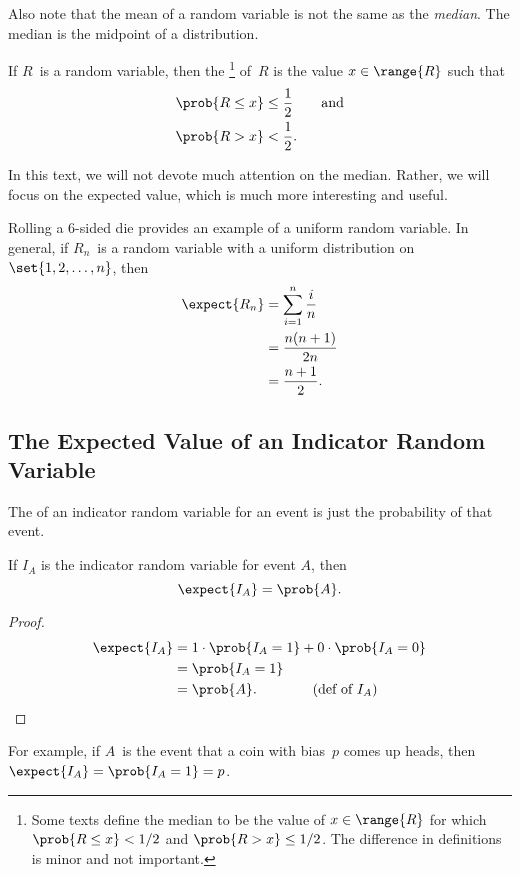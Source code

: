 Also note that the mean of a random variable is not the same as the
\emph{median}.  The median is the midpoint of a distribution.

\begin{definition}\label{def:17A2}
If $R$~is a random variable, then the \footnote{Some
  texts define the median to be the value of $x \in \range{R}$ for
  which $\prob{R \le x} < 1/2$ and $\prob{R > x} \le 1/2$.  The
  difference in definitions is minor and not important.} of~$R$ is the
value $x \in \range{R}$ such that
\begin{align*}
    \prob{R \le x} & \le \frac{1}{2} \qquad \text{and} \\
    \prob{R > x}   & <    \frac{1}{2}.
\end{align*}
\end{definition}

In this text, we will not devote much attention on the median.
Rather, we will focus on the expected value, which is much more
interesting and useful.

Rolling a 6-sided die provides an example of a uniform random
variable.  In general, if $R_n$~is a random variable with a uniform
distribution on~$\set{1, 2, \dots, n}$, then
\begin{align*}
\expect{R_n}    &= \sum_{i = 1}^n \frac{i}{n} \\
                &= \frac{n (n + 1)}{2n} \\
                &= \frac{n + 1}{2}.
\end{align*}

\subsection{The Expected Value of an Indicator Random Variable}

The  of an  indicator random
variable for an event is just the probability of that event.

\begin{lemma}\label{expindic}
If $I_A$ is the indicator random variable for event $A$, then
\[
\expect{I_A} = \prob{A}.
\]
\end{lemma}

\begin{proof}
\begin{align*}
\expect{I_A}
& =  1 \cdot \prob{I_A = 1} + 0 \cdot \prob{I_A = 0} \\
& = \prob{I_A = 1} \\
& =  \prob{A}. \qquad\qquad \text{(def of $I_A$)}\qedhere
\end{align*}
\end{proof}
For example, if $A$~is the event that a coin with bias~$p$ comes up
heads, then $\expect{I_A} = \prob{I_A=1} = p$.

